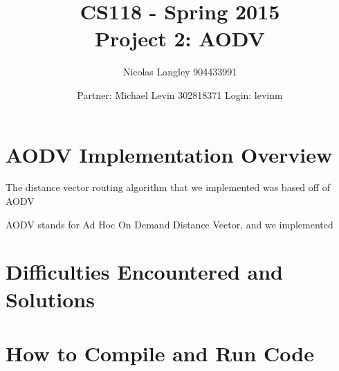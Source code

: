 \documentclass[12pt, titlepage]{article}
\begin{document}
\title{CS118 - Spring 2015 \\
Project 2: AODV}
\author{Nicolas Langley 904433991 \and Partner: Michael Levin 302818371 Login: levinm}

\maketitle
\section{AODV Implementation Overview}

The distance vector routing algorithm that we implemented was based off of AODV

AODV stands for Ad Hoc On Demand Distance Vector, and we implemented

\section{Difficulties Encountered and Solutions}



\section{How to Compile and Run Code}
\end{document}
